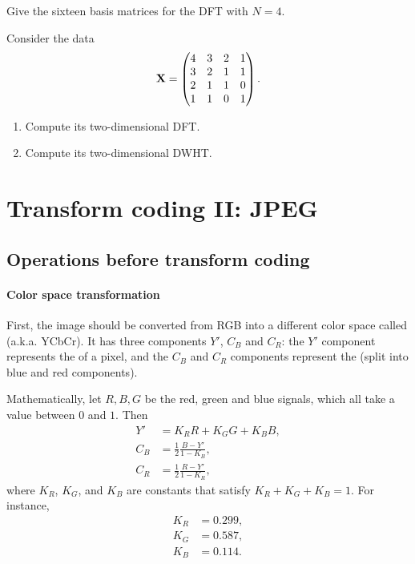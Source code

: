 \documentclass[a4paper, 11pt, openany]{book}
\begin{document}
\begin{exercise}
Give the sixteen basis matrices for the DFT with $N = 4$.
\end{exercise}

\begin{exercise}
Consider the data
\[
    {\bf X} = \begin{pmatrix}
    4 & 3 & 2 & 1\\
    3 & 2 & 1 & 1\\
    2 & 1 & 1 & 0\\
    1 & 1 & 0 & 1
    \end{pmatrix}.
\]
\begin{enumerate}
    \item Compute its two-dimensional DFT.

    \item Compute its two-dimensional DWHT.
\end{enumerate}
\end{exercise}


\section{Transform coding II: JPEG}
\label{sec:07}


\subsection{Operations before transform coding}

\paragraph{Color space transformation}
First, the image should be converted from RGB into a different color space called  (a.k.a. YCbCr). It has three components $Y'$, $C_B$ and $C_R$: the $Y'$ component represents the  of a pixel, and the $C_B$ and $C_R$ components represent the  (split into blue and red components).

Mathematically, let $R, B, G$ be the red, green and blue signals, which all take a value between $0$ and $1$. Then
\begin{align*}
    Y' &= K_R R + K_G G + K_B B,\\
    C_B &= \frac {1}{2} \frac {B-Y'}{1-K_B},\\
    C_R &=\frac {1}{2} \frac {R-Y'}{1-K_R},
\end{align*}
where $K_R$, $K_G$, and $K_B$ are constants that satisfy $K_R + K_G +K_B = 1$. For instance,
\begin{align*}
    K_R &= 0.299,\\
    K_G &= 0.587,\\
    K_B &=0.114.
\end{align*}
\end{document}
